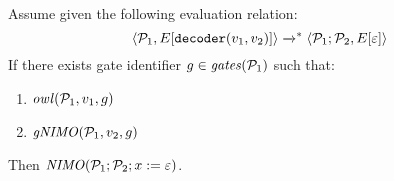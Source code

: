 \begin{lemma}[Decoding]
Assume given the following evaluation relation:
$$
\langle \mathcal{P}_1,E[\texttt{decoder}(v_1,v_2)] \rangle \xrightarrow{}^{*} \langle \mathcal{P}_1;\mathcal{P}_2,E[\varepsilon] \rangle
$$
If there exists gate identifier $g \in \mathit{gates}(\mathcal{P}_1)$ such that:
\begin{enumerate}
  \item $\mathit{owl}(\mathcal{P}_1,v_1,g)$
  \item $\mathit{gNIMO}(\mathcal{P}_1,v_2,g)$
\end{enumerate}
Then $\mathit{NIMO}(\mathcal{P}_1;\mathcal{P}_2;x := \varepsilon)$.
\end{lemma}
